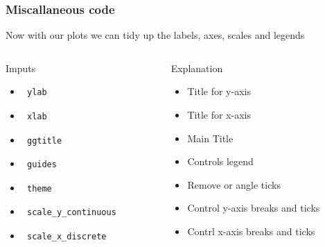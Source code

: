\documentclass[nogin]{beamer}\usepackage[]{graphicx}\usepackage[]{color}
\begin{document}
\begin{frame}[fragile]
\frametitle{Miscallaneous code}
Now with our plots we can tidy up the labels, axes, scales and legends
\scriptsize
\begin{columns}[T]
\begin{column}{0.5\textwidth}
\begin{block}{Imputs}
\begin{itemize}
\item \begin{verbatim} ylab \end{verbatim}
\item \begin{verbatim} xlab \end{verbatim}
\item \begin{verbatim} ggtitle \end{verbatim}
\item \begin{verbatim} guides \end{verbatim}
\item \begin{verbatim} theme \end{verbatim}
\item \begin{verbatim} scale_y_continuous \end{verbatim}
\item \begin{verbatim} scale_x_discrete \end{verbatim}
\end{itemize}
\end{block}
\end{column}
\begin{column}{0.5\textwidth}
\begin{block}{Explanation}
\begin{itemize}
\item Title for y-axis
\item Title for x-axis
\item Main Title
\item Controls legend
\item Remove or angle ticks
\item Control y-axis breaks and ticks
\item Contrl x-axis breaks and ticks
\end{itemize}
\end{block}
\end{column}
\end{columns}
\end{frame}
\end{document}
